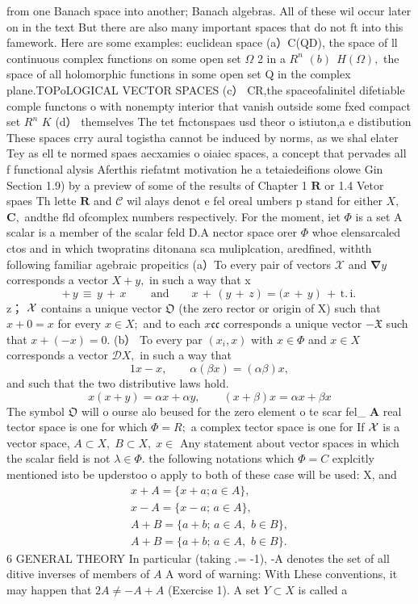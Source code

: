from one Banach space into another; Banach algebras. All of these wil occur later on in the text But there are also many important spaces that do not ft into this famework. Here are some examples: euclidean space (a）C(QD), the space of ll continuous complex functions on some open set $\Omega$ 2 in a $\textstyle R^{n}$ $(b)\ \ H(\Omega),$ the space of all holomorphic functions in some open set Q in the complex plane.TOPoLOGICAL VECTOR SPACES (c） CR,the spaceofalinitel difetiable comple functons o with nonempty interior that vanish outside some fxed compact set $\textstyle R^{n}$ $\textstyle K$ (d） themselves The tet fnctonspaes usd theor o istiuton,a e distibution These spaces crry aural togistha cannot be induced by norms, as we shal elater Tey as ell te normed spaes aecxamies o oiaiec spaces, a concept that pervades all f functional alysis Aferthis riefatmt motivation he a tetaiedeifions olowe Gin Section 1.9) by a preview of some of the results of Chapter 1 ${\boldsymbol{R}}$ or 1.4 Vetor spaes Th lette $\boldsymbol{R}$ and $\textstyle{\mathcal{C}}$ wil alays denot e fel oreal umbers p stand for either $X,$ ${\boldsymbol{C}},$ andthe fld ofcomplex numbers respectively. For the moment, iet $\Phi$ is a set A scalar is a member of the scalar feld D.A nector space orer $\Phi$ whoe elensarcaled ctos and in which twopratins ditonana sca muliplcation, aredfined, withth following familiar agebraic propeitics (a）To every pair of vectors $\textstyle{\mathcal{X}}$ and $\mathbf{\nabla}y$ corresponds a vector $X+y,$ in such a way that x $$ \left.+\,y\,\equiv\,y\,+\,x\,\qquad\mathrm{and}\qquad x\,+\,\left(y\,+\,z\right)= (x\,+\,y\right)\,+\,{\mathrm{t.}}\,{\mathrm{i.}}\, $$ z； $\textstyle{\cal{X}}$ contains a unique vector ${\mathfrak{O}}$ (the zero rector or origin of X) such that $x+0=x$ for every $x\in X;$ and to each $x{\mathfrak{c}}{\mathfrak{c}}$ corresponds a unique vector $-{\mathfrak{X}}$ such that $x+(-x)=0.$ (b） To every par $\scriptstyle(x_{i},x)$ with $x\in\Phi$ and $x\in X$ corresponds a vector ${\mathcal{D}}X,$ in such a way that $$ 1x-x,\qquad\alpha(\beta x)=(\alpha\beta)x, $$ and such that the two distributive laws hold. $$ x(x+y)=\alpha x+\alpha y,\qquad(x+\beta)x=\alpha x+\beta x $$ The symbol ${\mathfrak{O}}$ will o ourse alo beused for the zero element o te scar fel_ $\mathbf{A}$ real tector space is one for which $\Phi=R;$ a complex tector space is one for If $\textstyle{\cal{X}}$ is a vector space, $A\subset X,\;B\subset X,\;x\in$ Any statement about vector spaces in which the scalar field is not $\lambda\in\Phi.$ the following notations which $\Phi=C$ explcitly mentioned isto be upderstoo o apply to both of these case will be used: X, and $$ \begin{array}{c}{{x+A=\{x+a;a\in A\},}}\\ {{x-A=\{x-a;\,a\in A\},}}\\ {{A+B=\{a+b;\,a\in A,\,\,b\in B\},}}\\ {{A+B=\{a+b;\,a\in A,\,\,b\in B\}.}}\end{array} $$6 GENERAL THEORY In particular (taking .= -1), -A denotes the set of all ditive inverses of members of $\textstyle A$ A word of warning: With Lhese conventions, it may happen that $2A\neq-A+A$ (Exercise 1). A set $Y\subset X$ is called a 